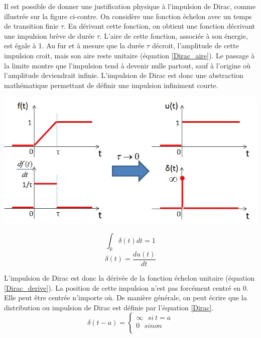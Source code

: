 	
	\begin{minipage}[l]{0.45\linewidth}
			Il est possible de donner une justification physique à l'impulsion de Dirac, comme illustrée sur la figure ci-contre. On considère une fonction échelon avec un temps de transition finie $\tau$. En dérivant cette fonction, on obtient une fonction décrivant une impulsion brève de durée $\tau$. L'aire de cette fonction, associée à son énergie, est égale à 1. Au fur et à mesure que la durée $\tau$ décroit, l'amplitude de cette impulsion croit, mais son aire reste unitaire (équation \ref{Dirac_aire}). Le passage à la limite montre que l'impulsion tend à devenir nulle partout, sauf à l'origine où l'amplitude deviendrait infinie. L'impulsion de Dirac est donc une abstraction mathématique permettant de définir une impulsion infiniment courte.	
	\end{minipage} \hfill
	\begin{minipage}[r]{0.55\linewidth}
		\includegraphics[scale=0.5]{images/generation_Dirac.jpg} 	
	\end{minipage}
	\vspace{0.5\baselineskip}
	
	\begin{equation}\label{Dirac_aire}
	\int_{\mathbb{R}}\delta (t)dt = 1 	
	\end{equation}
	\begin{equation}\label{Dirac_derive}
	\delta (t) = \frac{du(t)}{dt}	 	
	\end{equation}
	
	
	L'impulsion de Dirac est donc la dérivée de la fonction échelon unitaire (équation \ref{Dirac_derive}). La position de cette impulsion n'est pas forcément centré en 0. Elle peut être centrée n'importe où. De manière générale, on peut écrire que la distribution ou impulsion de Dirac est définie par l'équation \ref{Dirac}.
	\begin{equation}\label{Dirac}
	\delta (t-a) = \left \{
	\begin{array}{l}
	\infty~~~si~t = a \\
	0~~~sinon \\
	\end{array}
	\right . 	
	\end{equation}
	
